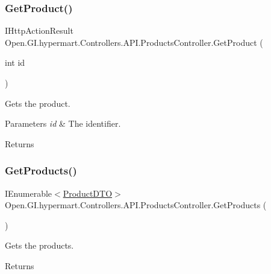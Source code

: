 \subsubsection{\texorpdfstring{Get\+Product()}{GetProduct()}}
{\footnotesize\ttfamily I\+Http\+Action\+Result Open.\+G\+I.\+hypermart.\+Controllers.\+A\+P\+I.\+Products\+Controller.\+Get\+Product (\begin{DoxyParamCaption}\item[{int}]{id }\end{DoxyParamCaption})}



Gets the product. 


\begin{DoxyParams}{Parameters}
{\em id} & The identifier.\\
\hline
\end{DoxyParams}
\begin{DoxyReturn}{Returns}

\end{DoxyReturn}
\hypertarget{class_open_1_1_g_i_1_1hypermart_1_1_controllers_1_1_a_p_i_1_1_products_controller_a717b795b9b5fdecb23a0fcc81b33f34f}{}\label{class_open_1_1_g_i_1_1hypermart_1_1_controllers_1_1_a_p_i_1_1_products_controller_a717b795b9b5fdecb23a0fcc81b33f34f} 
\subsubsection{\texorpdfstring{Get\+Products()}{GetProducts()}\hspace{0.1cm}{\footnotesize\ttfamily [1/2]}}
{\footnotesize\ttfamily I\+Enumerable$<$\hyperlink{class_open_1_1_g_i_1_1hypermart_1_1_data_transformation_objects_1_1_product_d_t_o}{Product\+D\+TO}$>$ Open.\+G\+I.\+hypermart.\+Controllers.\+A\+P\+I.\+Products\+Controller.\+Get\+Products (\begin{DoxyParamCaption}{ }\end{DoxyParamCaption})}



Gets the products. 

\begin{DoxyReturn}{Returns}

\end{DoxyReturn}
\hypertarget{class_open_1_1_g_i_1_1hypermart_1_1_controllers_1_1_a_p_i_1_1_products_controller_a5fe504dff28b3f3bdb69623ddd095d93}{}\label{class_open_1_1_g_i_1_1hypermart_1_1_controllers_1_1_a_p_i_1_1_products_controller_a5fe504dff28b3f3bdb69623ddd095d93} 
